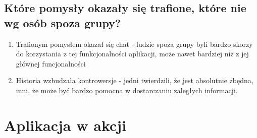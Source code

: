 \documentclass[12pt]{article}
\begin{document}
\subsection{Które pomysły okazały się trafione, które nie wg osób spoza grupy?}
\begin{enumerate}
	\item Trafionym pomysłem okazał się chat - ludzie spoza grupy byli bardzo skorzy do korzystania z tej funkcjonalności aplikacji, może nawet bardziej niż z jej głównej funcjonalności
	\item Historia wzbudzała kontrowersje - jedni twierdzili, że jest absolutnie zbędna, inni, że może być bardzo pomocna w dostarczaniu zaległych informacji.
\end{enumerate}


\section {Aplikacja w akcji}
\clearpage
\end{document}
